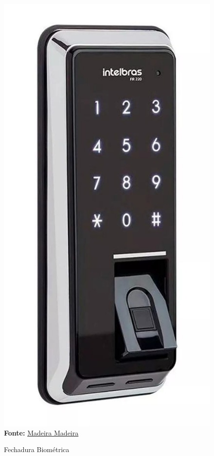 \FloatBarrier
\begin{figure}[!htbp]
	\centering
	\caption{Fechadura Biométrica}
	\includegraphics[scale=.15]{imagens/biometrica}
	\\\textbf{Fonte:} \href{https://www.madeiramadeira.com.br/fechadura-digital-fr220-acesso-por-biometrica-prox-senha-1560519.html}{Madeira Madeira}
	\label{fig:biometrica}
\end{figure}
\FloatBarrier

